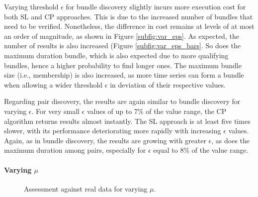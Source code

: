 Varying threshold $\epsilon$ for bundle discovery slightly incurs more execution cost for both SL and CP approaches. This is due to the increased number of bundles that need to be verified. Nonetheless, the difference in cost remains at levels of at most an order of magnitude, as shown in Figure \ref{subfig:var_eps}. As expected, the number of results is also increased (Figure \ref{subfig:var_eps_bars}. So does the maximum duration bundle, which is also expected due to more qualifying bundles, hence a higher probability to find longer ones. The maximum bundle size (i.e., membership) is also increased, as more time series can form a bundle when allowing a wider threshold $\epsilon$ in deviation of their respective values.

Regarding pair discovery, the results are again similar to bundle discovery for varying $\epsilon$. For very small $\epsilon$ values of up to 7\% of the value range, the CP algorithm returns results almost instantly. The SL approach is at least five times slower, with its performance deteriorating more rapidly with increasing $\epsilon$ values. Again, as in bundle discovery, the results are growing with greater $\epsilon$, as does the maximum duration among pairs, especially for $\epsilon$ equal to 8\% of the value range.

\paragraph{Varying $\mu$}
\begin{figure}[!tb]
 \centering
 \caption{Assessment against real data for varying $\mu$.}
 \label{fig:exp3}
\end{figure}

